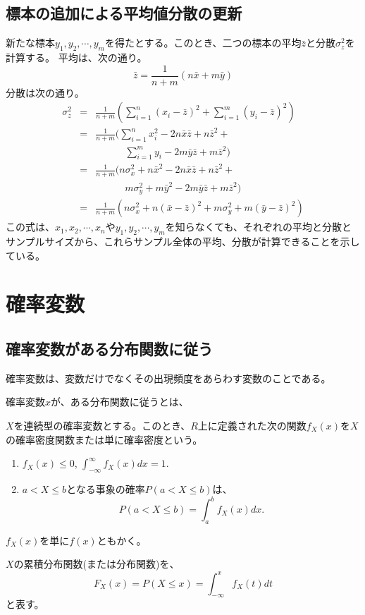 \subsection{標本の追加による平均値分散の更新}
新たな標本$y_1,y_2,\cdots,y_m$を得たとする。このとき、二つの標本の平均$\bar{z}$と分散$\sigma_z^2$を計算する。
平均は、次の通り。
\begin{equation*}
    \bar{z} = \frac{1}{n+m}(n\bar{x}+m\bar{y})
\end{equation*}
分散は次の通り。
\begin{eqnarray*}
    \sigma_z^2 &=& \frac{1}{n+m}(\sum_{i=1}^n(x_i-\bar{z})^2+\sum_{i=1}^m(y_i-\bar{z})^2) \\
    &=& \frac{1}{n+m}(\sum_{i=1}^n x_i^2-2n\bar{x}\bar{z}+n\bar{z}^2+ \\ 
    & &\qquad\quad \sum_{i=1}^m y_i -2m\bar{y}\bar{z}+m\bar{z}^2) \\
    &=& \frac{1}{n+m}( n\sigma_x^2 +n\bar{x}^2 -2n\bar{x}\bar{z} + n\bar{z}^2+ \\
    & &\qquad\quad  m\sigma^2_y+m\bar{y}^2-2m\bar{y}\bar{z}+m\bar{z}^2 ) \\
    &=& \frac{1}{n+m} (n\sigma^2_x+n(\bar{x}-\bar{z})^2 +m\sigma^2_y +m(\bar{y}-\bar{z})^2)
\end{eqnarray*}
この式は、$x_1,x_2,\cdots,x_n$や$y_1,y_2,\cdots,y_m$を知らなくても、それぞれの平均と分散とサンプルサイズから、これらサンプル全体の平均、分散が計算できることを示している。



\section{確率変数}
\subsection{確率変数がある分布関数に従う}
確率変数は、変数だけでなくその出現頻度をあらわす変数のことである。



確率変数$x$が、ある分布関数に従うとは、
\begin{defi}
 $X$を連続型の確率変数とする。このとき、$R$上に定義された次の関数$f_X(x)$を$X$の確率密度関数または単に確率密度という。
 \begin{enumerate}
  \item $f_X(x) \leq 0 $, $\int_{-\infty}^{\infty} f_X(x)dx=1$.
  \item $a<X\leq b$となる事象の確率$P(a<X\leq b)$は、
        \begin{equation}
         P(a<X\leq b) = \int_a^b f_X(x)dx.
        \end{equation}
 \end{enumerate}
 $f_X(x)$を単に$f(x)$ともかく。

$X$の累積分布関数(または分布関数)を、
\begin{equation*}
 F_X(x)=P(X\leq x) = \int_{-\infty}^x f_X(t)dt
\end{equation*}
と表す。
\end{defi}

